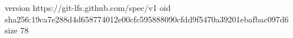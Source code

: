 version https://git-lfs.github.com/spec/v1
oid sha256:19ca7e288d4d658774012e00cfc595888090cfdd9f5470a39201ebafbac097d6
size 78
